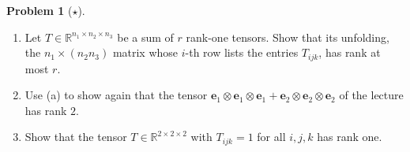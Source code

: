 \documentclass[11pt]{article}
\theoremstyle{definition}
\newtheorem{problem}{Problem}[section]
\begin{document}
\begin{problem}[$\star$]\label{pr:unfolding-rank}
    \begin{enumerate}[label=(\alph*)]
        \item Let $T \in \mathbb{R}^{n_1 \times n_2 \times n_3}$ be a sum of $r$ rank-one tensors. Show that its unfolding, the $n_1 \times (n_2n_3)$ matrix whose $i$-th row lists the entries $T_{ijk}$, has rank at most $r$.
        \item Use (a) to show again that the tensor $\mathbf{e}_1 \otimes \mathbf{e}_1 \otimes \mathbf{e}_1 + \mathbf{e}_2 \otimes \mathbf{e}_2 \otimes \mathbf{e}_2$ of the lecture has rank $2$.
        \item Show that the tensor $T \in \mathbb{R}^{2 \times 2 \times 2}$ with $T_{ijk} = 1$ for all $i, j, k$ has rank one.
    \end{enumerate}
\end{problem}
\end{document}
